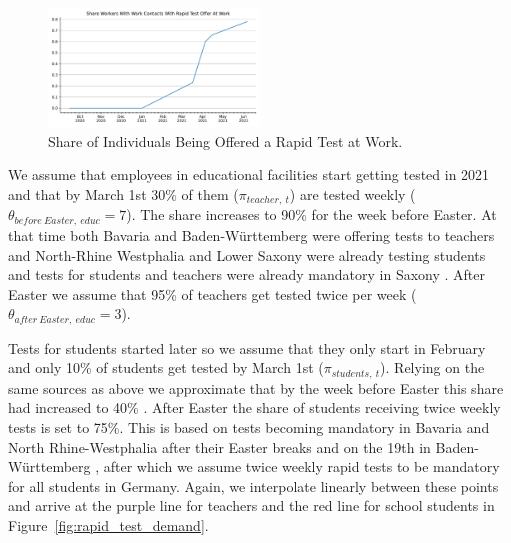 \begin{figure}
    \centering
    \includegraphics[width=0.5\textwidth]{figures/results/figures/data/testing/share_of_workers_with_rapid_test_offer_at_work}
    \caption{Share of Individuals Being Offered a Rapid Test at Work.}
\end{figure}
\FloatBarrier


We assume that employees in educational facilities start getting tested in 2021 and that
by March 1st 30\% of them ($\pi_{teacher,\:t}$) are tested weekly
($\theta_{before\:Easter,\:educ} = 7$). The share increases to 90\% for the week before
Easter. At that time both Bavaria \citep{STMGP2021} and Baden-Württemberg
\citep{MinisteriumKultus2021} were offering tests to teachers and North-Rhine Westphalia
\citep{SchulministeriumNRW2021} and Lower Saxony \citep{NSMK2021} were already testing
students and tests for students and teachers were already mandatory in Saxony
\citep{SMK2021}. After Easter we assume that 95\% of teachers get tested twice per week
($\theta_{after\:Easter,\:educ} = 3$).

Tests for students started later \citep{MinisteriumKultus2021, SchulministeriumNRW2021}
so we assume that they only start in February and only 10\% of students get tested by
March 1st ($\pi_{students,\:t}$). Relying on the same sources as above we approximate
that by the week before Easter this share had increased to 40\%
\citep{SchulministeriumNRW2021}. After Easter the share of students receiving twice
weekly tests is set to 75\%. This is based on tests becoming mandatory in Bavaria
\citep{BayerischeStaatskanzlei2021} and North Rhine-Westphalia
\citep{SchulministeriumNRW2021b} after their Easter breaks and on the 19th in
Baden-Württemberg \citep{KMBaWue2021}, after which we assume twice weekly rapid tests to
be mandatory for all students in Germany. Again, we interpolate linearly between these
points and arrive at the purple line for teachers and the red line for school students in
Figure~\ref{fig:rapid_test_demand}.


